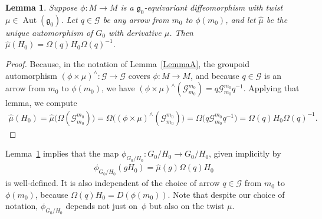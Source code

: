 \documentclass[pdftex]{sigma}
\DeclareMathOperator{\automorphism}{Aut}
\numberwithin{equation}{section}
\newtheorem{LemmaBlaom}[TheoremBlaom]{Lemma}
\begin{document}
\begin{LemmaBlaom}\label{LemmaB}
 Suppose $\phi \colon M \rightarrow M$ is a ${\mathfrak
    g}_0$-equivariant diffeomorphism with twist $\mu \in
  \automorphism({\mathfrak g}_0)$. Let $q \in {\mathcal G} $ be any
  arrow from $m_0$ to $\phi(m_0)$, and let $\hat\mu$ be the unique
  automorphism of $G_0$ with derivative $\mu$. Then
  $\hat\mu(H_0)=\Omega(q)H_0 \Omega(q)^{-1}$.
\end{LemmaBlaom}
\begin{proof}
  Because, in the notation of Lemma~\ref{LemmaA}, the groupoid
  automorphism $(\phi \times \mu)^\wedge \colon {\mathcal G}
  \rightarrow {\mathcal G} $ covers $\phi \colon M \rightarrow M$, and
  because $q \in {\mathcal G} $ is an arrow from $m_0$ to $\phi(m_0)$,
  we have $(\phi \times \mu)^\wedge({\mathcal G}_{m_0}^{m_0})=q
  {\mathcal G}_{m_0}^{m_0}q^{-1}$. Applying that lemma, we
  compute
  \begin{gather*}
    \hat\mu(H_0)=\hat\mu\big(\Omega({\mathcal G}_{m_0}^{m_0})\big)=\Omega\big( (\phi \times \mu)^\wedge({\mathcal G}_{m_0}^{m_0}) \big)=\Omega\big(q {\mathcal G}_{m_0}^{m_0}q^{-1}\big)=\Omega(q)H_0 \Omega(q)^{-1}.\tag*{\qed}
  \end{gather*}
  \renewcommand{\qed}{}
\end{proof}

Lemma~\ref{LemmaB} implies that the map $\phi_{G_0/H_0}\colon {G_0/H_0}
\rightarrow {G_0/H_0}$, given implicitly by
\begin{gather}
  \phi_{G_0/H_0} (g H_0)=\hat\mu(g)\Omega(q)H_0
  \label{abox}
\end{gather}
is well-def\/ined. It is also independent of the choice of arrow $q \in
{\mathcal G} $ from $m_0$ to $\phi(m_0)$, because
$\Omega(q)H_0=D(\phi(m_0))$. Note that despite our choice of notation,
$\phi_{G_0/H_0}$ depends not just on~$\phi $ but also on the twist
$\mu$.
\end{document}
